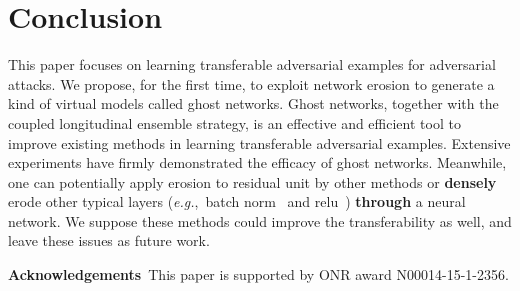 \documentclass[letterpaper]{article} %
\def\eg{\emph{e.g.}}
\begin{document}
\section{Conclusion}
This paper focuses on learning transferable adversarial examples for adversarial attacks. We propose, for the first time, to exploit network erosion to generate a kind of virtual models called ghost networks. Ghost networks, together with the coupled longitudinal ensemble strategy, is an effective and efficient tool to improve existing methods in learning transferable adversarial examples. Extensive experiments have firmly demonstrated the efficacy of ghost networks. Meanwhile, one can potentially apply erosion to residual unit by other methods or \textbf{densely} erode other typical layers (\eg,~batch norm~\cite{ioffe2015batch} and relu~\cite{nair2010rectified}) \textbf{through} a neural network. We suppose these methods could improve the transferability as well, and leave these issues as future work.

\vspace{1ex}\noindent\textbf{Acknowledgements}~This paper is supported by ONR award N00014-15-1-2356.

\fontsize{9.5pt}{10.5pt} \selectfont


\end{document}
